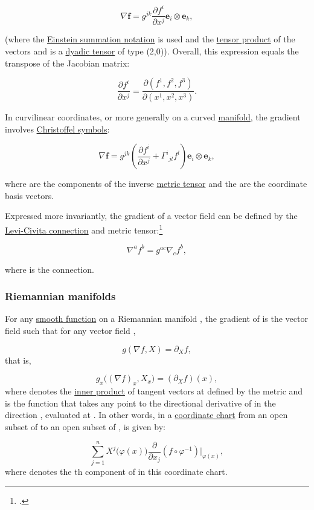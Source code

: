 \documentclass[
]{article}
\begin{document}
\[\nabla \mathbf{f}=g^{jk}\frac{\partial f^i}{\partial x^j} \mathbf{e}_i \otimes \mathbf{e}_k,\]

(where the \href{Einstein_summation_notation}{Einstein summation
notation} is used and the \href{tensor_product}{tensor product} of the
vectors and is a \href{dyadic_tensor}{dyadic tensor} of type (2,0)).
Overall, this expression equals the transpose of the Jacobian matrix:

\[\frac{\partial f^i}{\partial x^j} = \frac{\partial (f^1,f^2,f^3)}{\partial (x^1,x^2,x^3)}.\]

In curvilinear coordinates, or more generally on a curved
\href{Riemannian_manifold}{manifold}, the gradient involves
\href{Christoffel_symbols}{Christoffel symbols}:

\[\nabla \mathbf{f}=g^{jk}\left(\frac{\partial f^i}{\partial x^j}+{\Gamma^i}_{jl}f^l\right) \mathbf{e}_i \otimes \mathbf{e}_k,\]

where are the components of the inverse \href{metric_tensor}{metric
tensor} and the are the coordinate basis vectors.

Expressed more invariantly, the gradient of a vector field can be
defined by the \href{Levi-Civita_connection}{Levi-Civita connection} and
metric tensor:\footnote{.}

\[\nabla^a f^b = g^{ac} \nabla_c f^b ,\]

where is the connection.

\hypertarget{riemannian_manifolds}{%
\subsubsection{Riemannian manifolds}\label{riemannian_manifolds}}

For any \href{smooth_function}{smooth function} on a Riemannian manifold
, the gradient of is the vector field such that for any vector field ,

\[g(\nabla f, X) = \partial_X f,\] that is,

\[g_x\big((\nabla f)_x, X_x \big) = (\partial_X f) (x),\] where denotes
the \href{inner_product}{inner product} of tangent vectors at defined by
the metric and is the function that takes any point to the directional
derivative of in the direction , evaluated at . In other words, in a
\href{coordinate_chart}{coordinate chart} from an open subset of to an
open subset of , is given by:

\[\sum_{j=1}^n X^{j} \big(\varphi(x)\big) \frac{\partial}{\partial x_{j}}(f \circ \varphi^{-1}) \Bigg|_{\varphi(x)},\]
where denotes the th component of in this coordinate chart.
\end{document}
